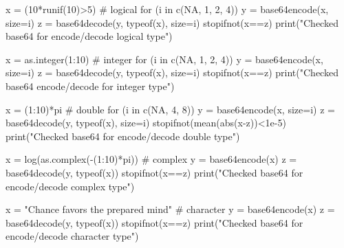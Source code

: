 \begin{Examples}
\begin{ExampleCode}
   x = (10*runif(10)>5) # logical
   for (i in c(NA, 1, 2, 4)) {
     y = base64encode(x, size=i)
     z = base64decode(y, typeof(x), size=i)
     stopifnot(x==z)
   }
   print("Checked base64 for encode/decode logical type")

   x = as.integer(1:10) # integer
   for (i in c(NA, 1, 2, 4)) {
     y = base64encode(x, size=i)
     z = base64decode(y, typeof(x), size=i)
     stopifnot(x==z)
   }
   print("Checked base64 encode/decode for integer type")
   
   x = (1:10)*pi        # double
   for (i in c(NA, 4, 8)) {
     y = base64encode(x, size=i)
     z = base64decode(y, typeof(x), size=i)
     stopifnot(mean(abs(x-z))<1e-5)
   }
   print("Checked base64 for encode/decode double type")
   
   x = log(as.complex(-(1:10)*pi))        # complex
   y = base64encode(x)
   z = base64decode(y, typeof(x))
   stopifnot(x==z)
   print("Checked base64 for encode/decode complex type")
  
   x = "Chance favors the prepared mind" # character
   y = base64encode(x)
   z = base64decode(y, typeof(x))
   stopifnot(x==z)
   print("Checked base64 for encode/decode character type")
\end{ExampleCode}
\end{Examples}

